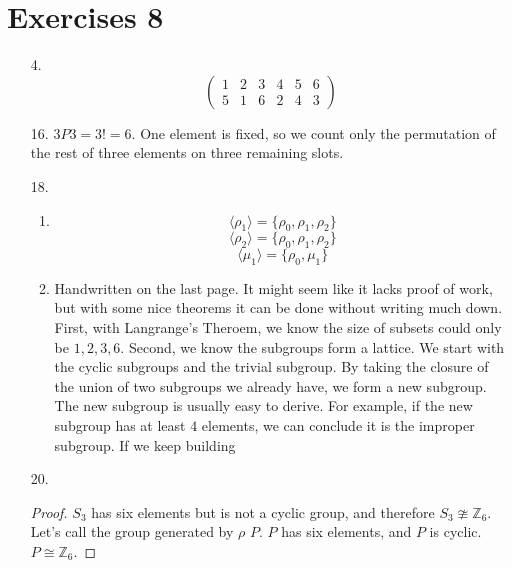 \documentclass{article}
\begin{document}
\section*{Exercises 8}
\begin{itemize}
\item [4.]
  \[\begin{pmatrix}
    1 & 2 & 3 & 4 & 5 & 6\\
    5 & 1 & 6 & 2 & 4 & 3
  \end{pmatrix}\]
\item [16.]
  $3P3 = 3! = 6$. One element is fixed, so we count only the permutation of the rest of three elements on three remaining slots.
\item [18.]
  \begin{enumerate}[label=\alph*.]
  \item
    \[\langle \rho_1 \rangle = \{\rho_0, \rho_1, \rho_2\}\]
    \[\langle \rho_2 \rangle = \{\rho_0, \rho_1, \rho_2\}\]
    \[\langle \mu_1 \rangle = \{\rho_0, \mu_1\}\]
  \item Handwritten on the last page. It might seem like it
    lacks proof of work, but with some nice theorems it can be done
    without writing much down. First, with Langrange's Theroem, we
    know the size of subsets could only be $1,2,3,6$. Second, we know
    the subgroups form a lattice. We start with the cyclic subgroups and
    the trivial subgroup. By taking the closure of the union of two
    subgroups we already have, we form a new subgroup. The new
    subgroup is usually easy to derive. For example, if
    the new subgroup has at least $4$ elements, we can conclude it is
    the improper subgroup. If we keep building 
  \end{enumerate}
\item [20.]
  \begin{proof}
    $S_3$ has six elements but is not a cyclic group, and therefore
    $S_3 \ncong \mathbb{Z}_6$. Let's call the group generated by
    $\rho$ $P$. $P$ has six elements, and $P$ is cyclic.
    $P \cong \mathbb{Z}_6$.


\end{proof}
\end{itemize}
\end{document}

